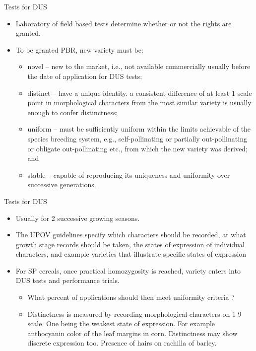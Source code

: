 \documentclass[
  ignorenonframetext,
  aspectratio=169]{beamer}
\providecommand{\tightlist}{%
  \setlength{\itemsep}{0pt}\setlength{\parskip}{0pt}}
\begin{document}
\begin{frame}{Tests for DUS}
\protect\hypertarget{tests-for-dus}{}
\begin{itemize}
\tightlist
\item
  Laboratory of field based tests determine whether or not the rights
  are granted.
\item
  To be granted PBR, new variety must be:

  \begin{itemize}
  \tightlist
  \item
    novel -- new to the market, i.e., not available commercially usually
    before the date of application for DUS tests;
  \item
    distinct -- have a unique identity. a consistent difference of at
    least 1 scale point in morphological characters from the most
    similar variety is usually enough to confer distinctness;
  \item
    uniform -- must be sufficiently uniform within the limits achievable
    of the species breeding system, e.g., self-pollinating or partially
    out-pollinating or obligate out-pollinating etc., from which the new
    variety was derived; and
  \item
    stable -- capable of reproducing its uniqueness and uniformity over
    successive generations.
  \end{itemize}
\end{itemize}
\end{frame}

\begin{frame}{Tests for DUS}
\protect\hypertarget{tests-for-dus-1}{}
\begin{itemize}
\tightlist
\item
  Usually for 2 successive growing seasons.
\item
  The UPOV guidelines specify which characters should be recorded, at
  what growth stage records should be taken, the states of expression of
  individual characters, and example varieties that illustrate specific
  states of expression
\item
  For SP cereals, once practical homozygosity is reached, variety enters
  into DUS tests and performance trials.

  \begin{itemize}
  \tightlist
  \item
    What percent of applications should then meet uniformity criteria ?
  \item
    Distinctness is measured by recording morphological characters on
    1-9 scale. One being the weakest state of expression. For example
    anthocyanin color of the leaf margins in corn. Distinctness may show
    discrete expression too. Presence of hairs on rachilla of barley.
  \end{itemize}
\end{itemize}
\end{frame}
\end{document}

